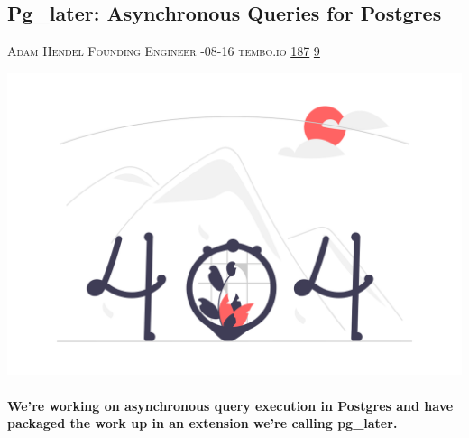\documentclass[10pt,a4paper]{article}
\begin{document}
\begin{multicols*}{2}
\begin{minipage}{\linewidth}
\subsection{Pg\_later: Asynchronous Queries for Postgres}
\textsc{\footnotesize
{\scriptsize\faUser}\space 
Adam Hendel Founding Engineer 
{\scriptsize\faCalendar}-08-16 
{\scriptsize\faGlobe}\space 
tembo.io 
{\scriptsize\faThumbsOUp}\space 
\href{http://news.ycombinator.com/item?id=37172689\&utm\_term=comment}{187} 
{\scriptsize\faComments}\space 
\href{http://news.ycombinator.com/item?id=37172689\&utm\_term=comment}{9} 
}
\par\medskip\noindent
\href{https://tembo.io/blog/introducing-pg-later/?utm\_source=hackernewsletter\&utm\_medium=email\&utm\_term=data}{
    \includegraphics[width=0.99\linewidth]{notfound.png}
}
\end{minipage}
\paragraph{}
\textbf{We’re working on asynchronous query execution in Postgres and have packaged the work up in an extension we’re calling pg\_later.}

\end{multicols*}
\end{document}
